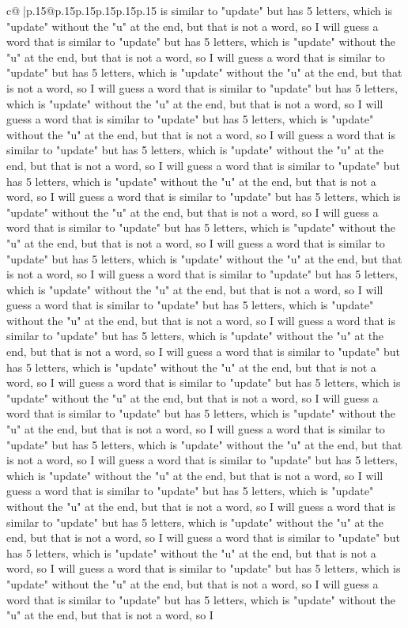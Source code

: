 \documentclass{article}
\begin{document}
{\begin{supertabular}{c@{$\;$}|p{.15\linewidth}@{}p{.15\linewidth}p{.15\linewidth}p{.15\linewidth}p{.15\linewidth}p{.15\linewidth}}
{{{is similar to "update" but has 5 letters, which is "update" without the "u" at the end, but that is not a word, so I will guess a word that is similar to "update" but has 5 letters, which is "update" without the "u" at the end, but that is not a word, so I will guess a word that is similar to "update" but has 5 letters, which is "update" without the "u" at the end, but that is not a word, so I will guess a word that is similar to "update" but has 5 letters, which is "update" without the "u" at the end, but that is not a word, so I will guess a word that is similar to "update" but has 5 letters, which is "update" without the "u" at the end, but that is not a word, so I will guess a word that is similar to "update" but has 5 letters, which is "update" without the "u" at the end, but that is not a word, so I will guess a word that is similar to "update" but has 5 letters, which is "update" without the "u" at the end, but that is not a word, so I will guess a word that is similar to "update" but has 5 letters, which is "update" without the "u" at the end, but that is not a word, so I will guess a word that is similar to "update" but has 5 letters, which is "update" without the "u" at the end, but that is not a word, so I will guess a word that is similar to "update" but has 5 letters, which is "update" without the "u" at the end, but that is not a word, so I will guess a word that is similar to "update" but has 5 letters, which is "update" without the "u" at the end, but that is not a word, so I will guess a word that is similar to "update" but has 5 letters, which is "update" without the "u" at the end, but that is not a word, so I will guess a word that is similar to "update" but has 5 letters, which is "update" without the "u" at the end, but that is not a word, so I will guess a word that is similar to "update" but has 5 letters, which is "update" without the "u" at the end, but that is not a word, so I will guess a word that is similar to "update" but has 5 letters, which is "update" without the "u" at the end, but that is not a word, so I will guess a word that is similar to "update" but has 5 letters, which is "update" without the "u" at the end, but that is not a word, so I will guess a word that is similar to "update" but has 5 letters, which is "update" without the "u" at the end, but that is not a word, so I will guess a word that is similar to "update" but has 5 letters, which is "update" without the "u" at the end, but that is not a word, so I will guess a word that is similar to "update" but has 5 letters, which is "update" without the "u" at the end, but that is not a word, so I will guess a word that is similar to "update" but has 5 letters, which is "update" without the "u" at the end, but that is not a word, so I will guess a word that is similar to "update" but has 5 letters, which is "update" without the "u" at the end, but that is not a word, so I will guess a word that is similar to "update" but has 5 letters, which is "update" without the "u" at the end, but that is not a word, so I will guess a word that is similar to "update" but has 5 letters, which is "update" without the "u" at the end, but that is not a word, so I }}}
\end{supertabular}}
\end{document}
